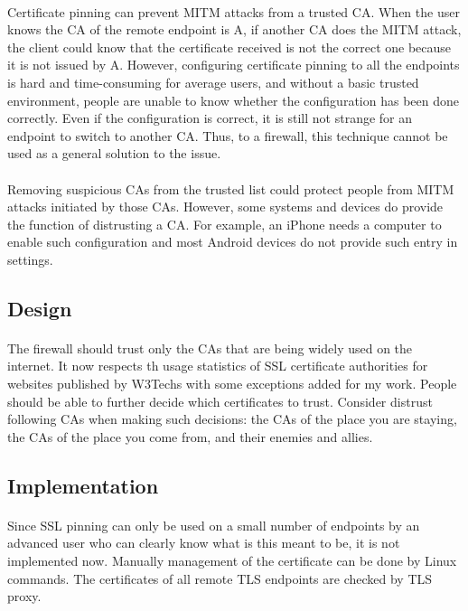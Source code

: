\documentclass[mscthesis]{usiinfthesis}
\begin{document}
\paragraph{}
Certificate pinning can prevent MITM attacks from a trusted CA. When the user knows the CA of the remote endpoint is A, if another CA does the MITM attack, the client could know that the certificate received is not the correct one because it is not issued by A. However, configuring certificate pinning to all the endpoints is hard and time-consuming for average users, and without a basic trusted environment, people are unable to know whether the configuration has been done correctly. Even if the configuration is correct, it is still not strange for an endpoint to switch to another CA. Thus, to a firewall, this technique cannot be used as a general solution to the issue.
\paragraph{}
Removing suspicious CAs from the trusted list could protect people from MITM attacks initiated by those CAs. However, some systems and devices do provide the function of distrusting a CA. For example, an iPhone needs a computer to enable such configuration and most Android devices do not provide such entry in settings.
\subsection{Design}
\paragraph{}
The firewall should trust only the CAs that are being widely used on the internet. It now respects th usage statistics of SSL certificate authorities for websites published by W3Techs \citep{cert:stat} with some exceptions added for my work. People should be able to further decide which certificates to trust. Consider distrust following CAs when making such decisions: the CAs of the place you are staying, the CAs of the place you come from, and their enemies and allies.
\subsection{Implementation}
\paragraph{}
Since SSL pinning can only be used on a small number of endpoints by an advanced user who can clearly know what is this meant to be, it is not implemented now. Manually management of the certificate can be done by Linux commands. The certificates of all remote TLS endpoints are checked by TLS proxy.
\end{document}
